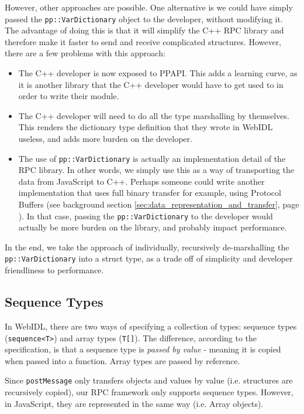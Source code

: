 However, other approaches are possible. One alternative is we could have simply passed the \lstinline{pp::VarDictionary} object to the developer, without modifying it. The advantage of doing this is that it will simplify the C++ RPC library and therefore make it faster to send and receive complicated structures. However, there are a few problems with this approach:

\begin{itemize}
	\item The C++ developer is now exposed to PPAPI. This adds a learning curve, as it is another library that the C++ developer would have to get used to in order to write their module.
	\item The C++ developer will need to do all the type marshalling by themselves. This renders the dictionary type definition that they wrote in WebIDL useless, and adds more burden on the developer.
	\item The use of \lstinline{pp::VarDictionary} is actually an implementation detail of the RPC library. In other words, we simply use this as a way of transporting the data from JavaScript to C++. Perhaps someone could write another implementation that uses full binary transfer for example, using Protocol Buffers (see background section \ref{sec:data_representation_and_transfer}, page \pageref{sec:data_representation_and_transfer}). In that case, passing the \lstinline{pp::VarDictionary} to the developer would actually be more burden on the library, and probably impact performance.
\end{itemize}

In the end, we take the approach of individually, recursively de-marshalling the \lstinline{pp::VarDictionary} into a struct type, as a trade off of simplicity and developer friendliness to performance.

\subsection{Sequence Types} %
\label{sub:sequence_types}
In WebIDL, there are two ways of specifying a collection of types: sequence types (\lstinline{sequence<T>}) and array types (\lstinline{T[]}). The difference, according to the specification, is that a sequence type is \emph{passed by value} - meaning it is copied when passed into a function. Array types are passed by reference. 

Since \lstinline{postMessage} only transfers objects and values by value (i.e. structures are recursively copied), our RPC framework only supports sequence types. However, in JavaScript, they are represented in the same way (i.e. Array objects).

